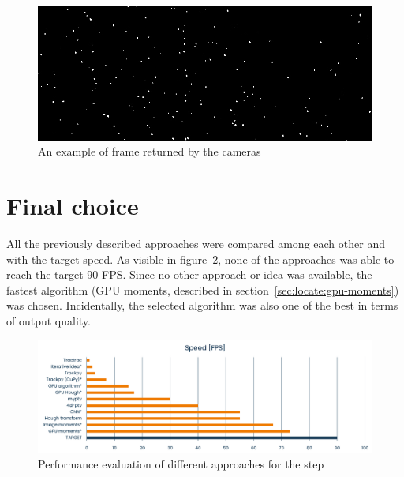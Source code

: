 \begin{figure}[H]
	\centerline{\includegraphics[width=\locateimgsize]{images/locate/_original-frame.png}}
	\caption{\centering An example of frame returned by the cameras}
	\label{fig:locate:original-crop}
\end{figure}


\newpage
 \newpage
 \newpage
 \newpage
 \newpage
 \newpage
 \newpage
 \newpage
 \newpage
 \newpage
 \newpage
 \newpage
 \newpage
 \newpage

\section{Final choice}

All the previously described approaches were compared among each other and with the target speed.
As visible in figure~\ref{fig:locate:speed}, none of the approaches was able to reach the target 90 FPS.
Since no other approach or idea was available, the fastest algorithm (GPU moments, described in section~\ref{sec:locate:gpu-moments}) was chosen.
Incidentally, the selected algorithm was also one of the best in terms of output quality.

\begin{figure}
	\centerline{\includegraphics[width=\textwidth]{images/locate-speed-comparison.png}}
	\caption{\centering Performance evaluation of different approaches for the \locate* step}
	\label{fig:locate:speed}
\end{figure}


